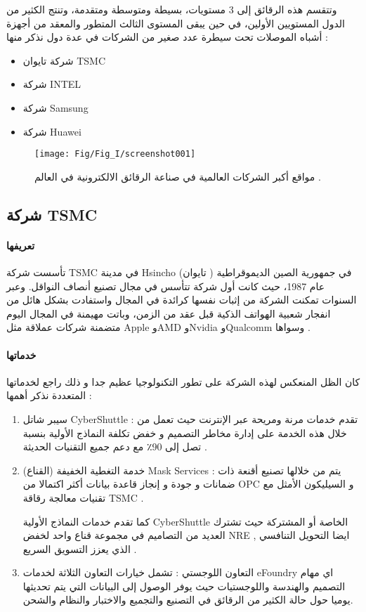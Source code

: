 وتتقسم هذه الرقائق إلى 3 مستويات، بسيطة ومتوسطة ومتقدمة، وتنتج الكثير من الدول المستويين الأولين، في حين يبقى المستوى الثالث المتطور والمعقد من أجهزة أشباه الموصلات تحت سيطرة عدد صغير من الشركات في عدة دول نذكر منها :

\begin{itemize}
	\item 
	شركة تايوان  TSMC
	\item 
	شركة INTEL 
	\item 
	شركة Samsung 
	\item 
	شركة Huawei
\end{itemize}

\begin{figure}[h!]
	\centering
	\texttt{[image: Fig/Fig\_I/screenshot001]}
	\caption{مواقع أكبر الشركات العالمية في صناعة الرقائق الالكترونية في العالم . }
	\label{fig:screenshot001}
\end{figure}
\FloatBarrier

\subsection{ شركة TSMC  }
\paragraph{تعريفها}
تأسست شركة TSMC في مدينة Hsincho في جمهورية الصين الديموقراطية ( تايوان) عام 1987، حيث كانت أول شركة تتأسس في مجال تصنيع أنصاف النواقل. وعبر السنوات تمكنت الشركة من إثبات نفسها كرائدة في المجال  واستفادت بشكل هائل من انفجار شعبية الهواتف الذكية قبل عقد من الزمن، وباتت مهيمنة في المجال اليوم متضمنة شركات عملاقة مثل Apple وAMD وNvidia وQualcomm وسواها . \cite{a7}
\paragraph{خدماتها} كان الظل المنعكس لهذه الشركة على تطور التكنولوجيا عظيم جدا و ذلك راجع لخدماتها المتعددة نذكر أهمها :
\begin{enumerate}
	\item 
	سيبر شاتل CyberShuttle :
	تقدم خدمات مرنة ومريحة عبر الإنترنت حيث تعمل من خلال هذه الخدمة على إدارة مخاطر التصميم و 	خفض تكلفة النماذج الأولية بنسبة تصل إلى 90٪ مع 	دعم جميع التقنيات الحديثة .
	
	\item 
	خدمة التغطية الخفيفة  (القناع)   Mask Services :
	يتم من خلالها تصنيع أقنعة ذات ضمانات و جودة و إنجاز قاعدة بيانات أكثر اكتمالا من OPC و السيليكون الأمثل مع تقنيات معالجة رقاقة TSMC . 
	
	كما تقدم خدمات النماذج الأولية CyberShuttle الخاصة أو المشتركة حيث تشترك العديد من التصاميم في مجموعة قناع واحد لخفض NRE , ايضا التحويل التنافسي الذي يعزز التسويق السريع .
	
	\item
	التعاون اللوجستي :  تشمل خيارات التعاون الثلاثة لخدمات eFoundry اي مهام التصميم والهندسة واللوجستيات حيث يوفر الوصول إلى البيانات التي يتم تحديثها يوميا حول حالة الكثير من الرقائق في التصنيع والتجميع والاختبار والنظام والشحن. \cite{a7}
	
\end{enumerate}


